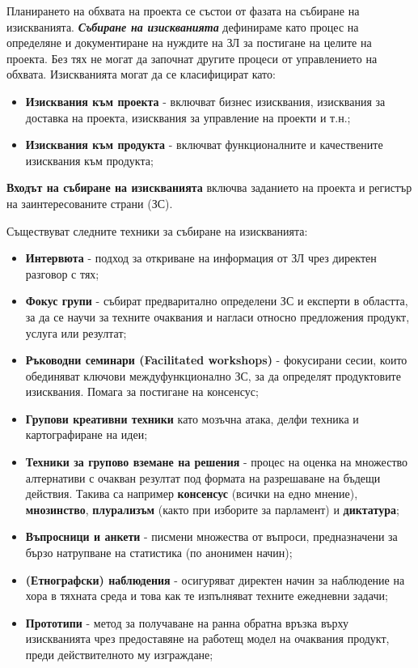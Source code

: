 \documentclass[fleqn,12pt]{article}
\begin{document}
Планирането на обхвата на проекта се състои от фазата на събиране на изискванията.
\textbf{\textit{Събиране на изискванията}} дефинираме като процес на определяне и документиране на нуждите на ЗЛ за постигане на целите на проекта.
Без тях не могат да започнат другите процеси от управлението на обхвата.
Изискванията могат да се класифицират като:
\begin{itemize}
    \item \textbf{Изисквания към проекта} - включват бизнес изисквания, изисквания за доставка на проекта, изисквания за управление на проекти и т.н.;
    \item \textbf{Изисквания към продукта} - включват функционалните и качествените изисквания към продукта;
\end{itemize}

\textbf{Входът на събиране на изискванията} включва заданието на проекта и регистър на заинтересованите страни (ЗС).
\bigbreak

Съществуват следните техники за събиране на изискванията:
\begin{itemize}
    \item \textbf{Интервюта} - подход за откриване на информация от ЗЛ чрез директен разговор с тях;
    \item \textbf{Фокус групи} - събират предваритално определени ЗС и експерти в областта, за да се научи за техните очаквания и нагласи относно предложения продукт, услуга или резултат;
    \item \textbf{Ръководни семинари (Facilitated workshops)} - фокусирани сесии, които обединяват ключови междуфункционално ЗС, за да определят продуктовите изисквания. Помага за постигане на консенсус;
    \item \textbf{Групови креативни техники} като мозъчна атака, делфи техника и картографиране на идеи;
    \item \textbf{Техники за групово вземане на решения} - процес на оценка на множество алтернативи с очакван резултат под формата на разрешаване на бъдещи действия.
    Такива са например \textbf{консенсус} (всички на едно мнение), \textbf{мнозинство}, \textbf{плурализъм} (както при изборите за парламент) и \textbf{диктатура};
    \item \textbf{Въпросници и анкети} - писмени множества от въпроси, предназначени за бързо натрупване на статистика (по анонимен начин);
    \item \textbf{(Етнографски) наблюдения} - осигуряват директен начин за наблюдение на хора в тяхната среда и това как те изпълняват техните ежедневни задачи;
    \item \textbf{Прототипи} - метод за получаване на ранна обратна връзка върху изискванията чрез предоставяне на работещ модел на очаквания продукт, преди действителното му изграждане;
\end{itemize}
\end{document}
